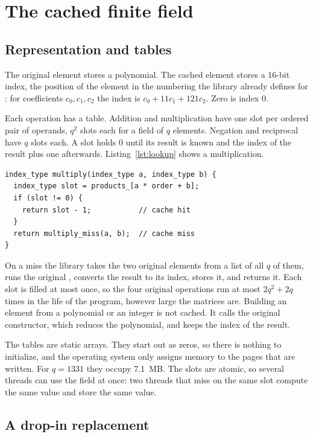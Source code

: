 \section{The cached finite field}
\label{sec:cached}

\subsection{Representation and tables}

The original element stores a polynomial. The cached element stores a 16-bit index, the
position of the element in the numbering the library already defines for
: for coefficients $c_0, c_1, c_2$ the index is $c_0 + 11c_1 + 121c_2$.
Zero is index 0.

Each operation has a table. Addition and multiplication have one slot per ordered pair of
operands, $q^2$ slots each for a field of $q$ elements. Negation and reciprocal have $q$
slots each. A slot holds 0 until its result is known and the index of the result plus one
afterwards. Listing~\ref{lst:lookup} shows a multiplication.

\begin{lstlisting}[caption={A cached multiplication, simplified. \code{order} is $q$.},label={lst:lookup}]
index_type multiply(index_type a, index_type b) {
  index_type slot = products_[a * order + b];
  if (slot != 0) {
    return slot - 1;           // cache hit
  }
  return multiply_miss(a, b);  // cache miss
}
\end{lstlisting}

On a miss the library takes the two original elements from a list of all $q$ of them,
runs the original , converts the result to its index, stores it, and returns
it. Each slot is filled at most once, so the four original operations run at most
$2q^2 + 2q$ times in the life of the program, however large the matrices are. Building an
element from a polynomial or an integer is not cached. It calls the original constructor,
which reduces the polynomial, and keeps the index of the result.

The tables are static arrays. They start out as zeros, so there is nothing to initialize,
and the operating system only assigns memory to the pages that are written. For $q = 1331$
they occupy 7.1~MB. The slots are atomic, so several threads can use the field at once:
two threads that miss on the same slot compute the same value and store the same value.

\subsection{A drop-in replacement}

